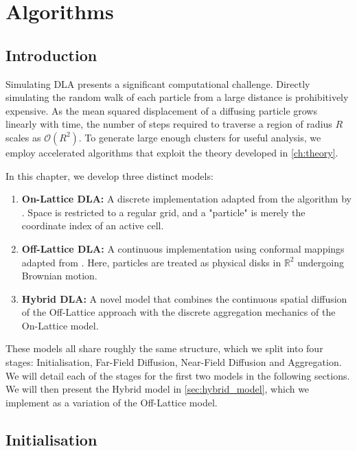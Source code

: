 \documentclass[12pt, a4paper, oneside]{report}
\theoremstyle{remark}
\begin{document}
\chapter{Algorithms}
\label{ch:algorithms}

\section{Introduction}
\label{sec:algo_intro}

Simulating DLA presents a significant computational challenge. Directly simulating the random walk of each particle from a large distance is prohibitively expensive. As the mean squared displacement of a diffusing particle grows linearly with time, the number of steps required to traverse a region of radius $R$ scales as $\mathcal{O}(R^2)$. To generate large enough clusters for useful analysis, we employ accelerated algorithms that exploit the theory developed in \cref{ch:theory}.

In this chapter, we develop three distinct models:
\begin{enumerate}
    \item \textbf{On-Lattice DLA:} A discrete implementation adapted from the algorithm by \citet{Loh2014}. Space is restricted to a regular grid, and a "particle" is merely the coordinate index of an active cell.
    \item \textbf{Off-Lattice DLA:} A continuous implementation using conformal mappings adapted from \citet{Bell2019}. Here, particles are treated as physical disks in $\mathbb{R}^2$ undergoing Brownian motion.
    \item \textbf{Hybrid DLA:} A novel model that combines the continuous spatial diffusion of the Off-Lattice approach with the discrete aggregation mechanics of the On-Lattice model.
\end{enumerate}

These models all share roughly the same structure, which we split into four stages: Initialisation, Far-Field Diffusion, Near-Field Diffusion and Aggregation. We will detail each of the stages for the first two models in the following sections. We will then present the Hybrid model in \cref{sec:hybrid_model}, which we implement as a variation of the Off-Lattice model.
\section{Initialisation}
\label{sec:initialisation}
\end{document}
